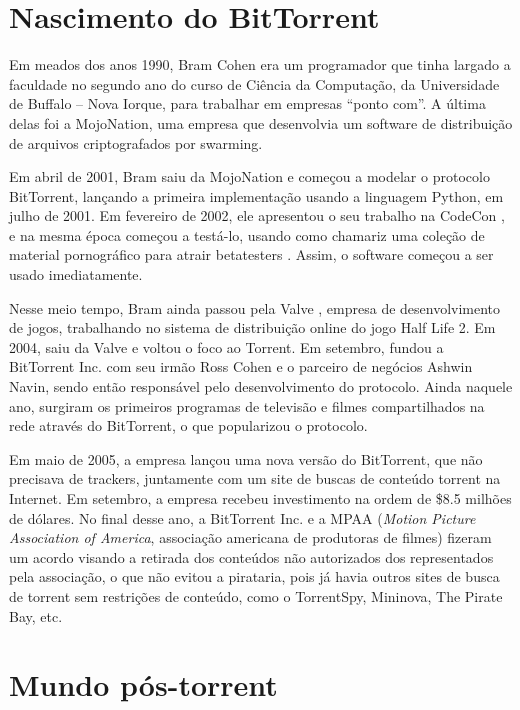 \section{Nascimento do BitTorrent}

Em meados dos anos 1990, Bram Cohen era um programador que tinha largado a faculdade no
segundo ano do curso de Ciência da Computação, da Universidade de Buffalo -- Nova
Iorque, para trabalhar em empresas ``ponto com''. A última delas foi a MojoNation, uma
empresa que desenvolvia um software de distribuição de arquivos criptografados por
\gls*{swarming}.

Em abril de 2001, Bram saiu da MojoNation e começou a modelar o protocolo BitTorrent,
lançando a primeira implementação usando a linguagem Python, em julho de 2001. Em
fevereiro de 2002, ele apresentou o seu trabalho na CodeCon \cite{site:codecon}, e na
mesma época começou a testá-lo, usando como chamariz uma coleção de material
pornográfico para atrair \glspl{betatester} \cite{site:bramcohen}. Assim, o software
começou a ser usado imediatamente.

Nesse meio tempo, Bram ainda passou pela Valve \cite{wiki:bramcohen}, empresa de
desenvolvimento de jogos, trabalhando no sistema de distribuição online do jogo Half
Life 2. Em 2004, saiu da Valve e voltou o foco ao Torrent. Em setembro, fundou a
BitTorrent Inc. com seu irmão Ross Cohen e o parceiro de negócios Ashwin Navin, sendo
então responsável pelo desenvolvimento do protocolo. Ainda naquele ano, surgiram os
primeiros programas de televisão e filmes compartilhados na rede através do BitTorrent,
o que popularizou o protocolo.

Em maio de 2005, a empresa lançou uma nova versão do BitTorrent, que não precisava de
\glspl{tracker}, juntamente com um site de buscas de conteúdo torrent na Internet. Em
setembro, a empresa recebeu investimento na ordem de \$8.5 milhões de dólares. No final
desse ano, a BitTorrent Inc. e a MPAA (\emph{Motion Picture Association of America},
associação americana de produtoras de filmes) fizeram um acordo \cite{wiki:mpaa}
visando a retirada dos conteúdos não autorizados dos representados pela associação, o
que não evitou a pirataria, pois já havia outros sites de busca de torrent sem
restrições de conteúdo, como o TorrentSpy, Mininova, The Pirate Bay, etc.

\section{Mundo pós-torrent}


